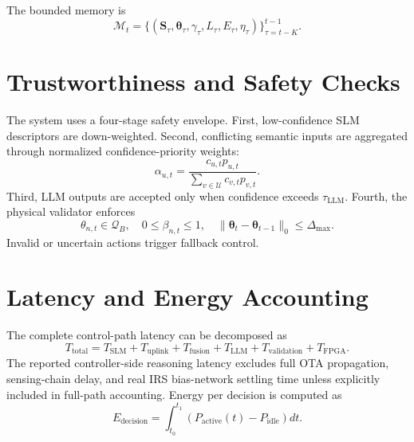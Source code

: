 \documentclass[11pt]{article}
\begin{document}
The bounded memory is
\begin{equation}
\mathcal{M}_{t}=\{(\mathbf{S}_{\tau},\boldsymbol{\theta}_{\tau},\gamma_{\tau},L_{\tau},E_{\tau},\eta_{\tau})\}_{\tau=t-K}^{t-1}.
\end{equation}

\section{Trustworthiness and Safety Checks}
The system uses a four-stage safety envelope. First, low-confidence SLM descriptors are down-weighted. Second, conflicting semantic inputs are aggregated through normalized confidence-priority weights:
\begin{equation}
\alpha_{u,t}=\frac{c_{u,t}p_{u,t}}{\sum_{v\in\mathcal{U}}c_{v,t}p_{v,t}}.
\end{equation}
Third, LLM outputs are accepted only when confidence exceeds $\tau_{\mathrm{LLM}}$. Fourth, the physical validator enforces
\begin{equation}
\theta_{n,t}\in\mathcal{Q}_{B},\quad 0\leq\beta_{n,t}\leq1,\quad \|\boldsymbol{\theta}_{t}-\boldsymbol{\theta}_{t-1}\|_0\leq\Delta_{\max}.
\end{equation}
Invalid or uncertain actions trigger fallback control.

\section{Latency and Energy Accounting}
The complete control-path latency can be decomposed as
\begin{equation}
T_{\mathrm{total}}=T_{\mathrm{SLM}}+T_{\mathrm{uplink}}+T_{\mathrm{fusion}}+T_{\mathrm{LLM}}+T_{\mathrm{validation}}+T_{\mathrm{FPGA}}.
\end{equation}
The reported controller-side reasoning latency excludes full OTA propagation, sensing-chain delay, and real IRS bias-network settling time unless explicitly included in full-path accounting. Energy per decision is computed as
\begin{equation}
E_{\mathrm{decision}}=\int_{t_0}^{t_1}\left(P_{\mathrm{active}}(t)-P_{\mathrm{idle}}\right)dt.
\end{equation}
\end{document}
